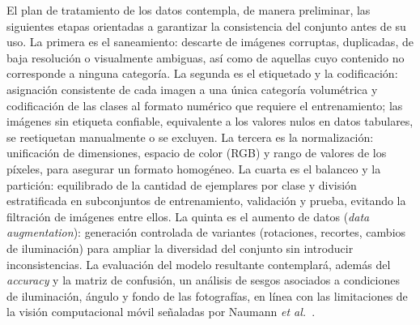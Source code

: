 
El plan de tratamiento de los datos contempla, de manera preliminar, las siguientes etapas orientadas a garantizar la consistencia del conjunto antes de su uso. La primera es el saneamiento: descarte de imágenes corruptas, duplicadas, de baja resolución o visualmente ambiguas, así como de aquellas cuyo contenido no corresponde a ninguna categoría. La segunda es el etiquetado y la codificación: asignación consistente de cada imagen a una única categoría volumétrica y codificación de las clases al formato numérico que requiere el entrenamiento; las imágenes sin etiqueta confiable, equivalente a los valores nulos en datos tabulares, se reetiquetan manualmente o se excluyen. La tercera es la normalización: unificación de dimensiones, espacio de color (RGB) y rango de valores de los píxeles, para asegurar un formato homogéneo. La cuarta es el balanceo y la partición: equilibrado de la cantidad de ejemplares por clase y división estratificada en subconjuntos de entrenamiento, validación y prueba, evitando la filtración de imágenes entre ellos. La quinta es el aumento de datos (\emph{data augmentation}): generación controlada de variantes (rotaciones, recortes, cambios de iluminación) para ampliar la diversidad del conjunto sin introducir inconsistencias. La evaluación del modelo resultante contemplará, además del \emph{accuracy} y la matriz de confusión, un análisis de sesgos asociados a condiciones de iluminación, ángulo y fondo de las fotografías, en línea con las limitaciones de la visión computacional móvil señaladas por Naumann \textit{et al.}\ \parencite{NaumannEtAl2023}.

